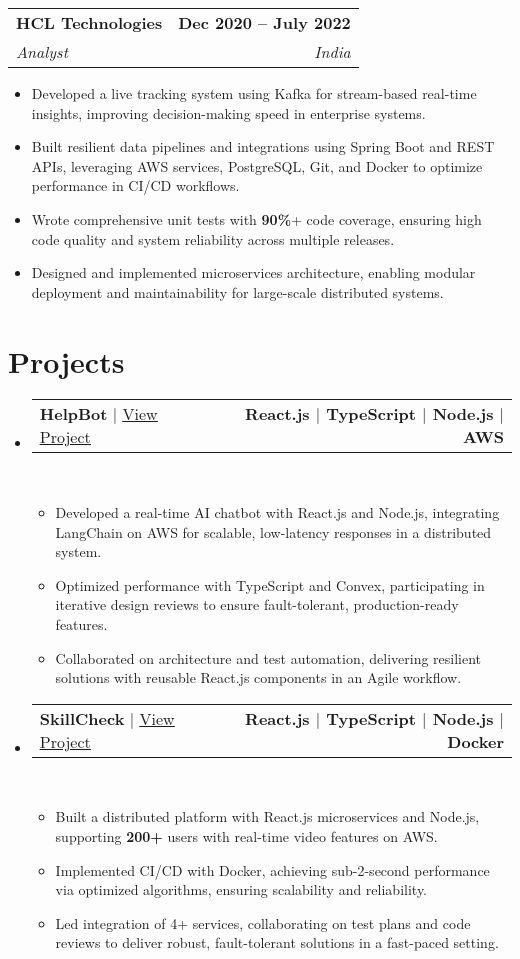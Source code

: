 \documentclass[letterpaper,11pt]{article}
\makeatletter
\newcommand{\resumeItem}[1]{
  \item\small{
    {#1 \vspace{0pt}}
  }
}
\newcommand{\resumeSubheading}[4]{
  \vspace{-2pt}\item
    \begin{tabular*}{1.0\textwidth}[t]{l@{\extracolsep{\fill}}r}
      \textbf{#1} & \textbf{\small #2} \\
      \textit{\small #3} & \textit{\small #4} \\
    \end{tabular*}\vspace{-7pt}
}
\newcommand{\resumeProjectHeading}[2]{
  \item
    \begin{tabular*}{1.001\textwidth}{l@{\extracolsep{\fill}}r}
      \small #1 & \textbf{\small #2}\\
    \end{tabular*}\vspace{-7pt}
}
\newcommand{\resumeSubHeadingListStart}{\begin{itemize}[leftmargin=0.0in, label={}]}
\newcommand{\resumeSubHeadingListEnd}{\end{itemize}\vspace{0pt}}
\newcommand{\resumeItemListStart}{\begin{itemize}}
\newcommand{\resumeItemListEnd}{\end{itemize}\vspace{-5pt}}
\makeatother
\begin{document}
  \vspace{-7pt}
  \resumeSubheading{HCL Technologies}{Dec 2020 – July 2022}{Analyst}{India} 
  \resumeItemListStart
    \resumeItem{Developed a live tracking system using Kafka for stream-based real-time insights, improving decision-making speed in enterprise systems.}
    \resumeItem{Built resilient data pipelines and integrations using Spring Boot and REST APIs, leveraging AWS services, PostgreSQL, Git, and Docker to optimize performance in CI/CD workflows.}
    \resumeItem{Wrote comprehensive unit tests with \textbf{90\%}+ code coverage, ensuring high code quality and system reliability across multiple releases.}
    \resumeItem{Designed and implemented microservices architecture, enabling modular deployment and maintainability for large-scale distributed systems.}
  \resumeItemListEnd


\section{Projects} 
\vspace{-9pt}
\resumeSubHeadingListStart
\resumeProjectHeading
  {\textbf{HelpBot} $|$ \href{https://github.com/Anarvsingh/HelpBot}{\underline{View Project}}}
  {React.js $|$ TypeScript $|$ Node.js $|$ AWS}
  \\[5mm]
\resumeItemListStart
  \resumeItem{Developed a real-time AI chatbot with React.js and Node.js, integrating LangChain on AWS for scalable, low-latency responses in a distributed system.}
  \resumeItem{Optimized performance with TypeScript and Convex, participating in iterative design reviews to ensure fault-tolerant, production-ready features.}
  \resumeItem{Collaborated on architecture and test automation, delivering resilient solutions with reusable React.js components in an Agile workflow.}
\resumeItemListEnd

\vspace{-12pt}
\resumeProjectHeading
  {\textbf{SkillCheck} $|$ \href{https://github.com/Anarvsingh/SkillCheck2}{\underline{View Project}}}
  {React.js $|$ TypeScript $|$ Node.js $|$ Docker}
  \\[5mm]
\resumeItemListStart
  \resumeItem{Built a distributed platform with React.js microservices and Node.js, supporting \textbf{200+} users with real-time video features on AWS.}
  \resumeItem{Implemented CI/CD with Docker, achieving sub-2-second performance via optimized algorithms, ensuring scalability and reliability.}
  \resumeItem{Led integration of 4+ services, collaborating on test plans and code reviews to deliver robust, fault-tolerant solutions in a fast-paced setting.}
\resumeItemListEnd
\resumeSubHeadingListEnd
\vspace{-15pt}
\end{document}
